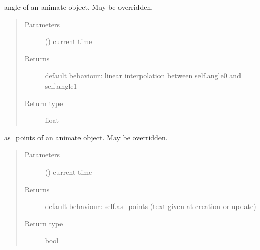 \documentclass[letterpaper,10pt,english]{sphinxmanual}
\begin{document}
\begin{fulllineitems}
\begin{fulllineitems}
\begin{quote}
\begin{description}
\end{description}\end{quote}

\end{fulllineitems}


\begin{fulllineitems}
\label{\detokenize{Reference:salabim.Animate.angle}}
angle of an animate object. May be overridden.
\begin{quote}\begin{description}
\item[{Parameters}] \leavevmode
{} () \textendash{} current time

\item[{Returns}] \leavevmode
{} \textendash{} default behaviour: linear interpolation between self.angle0 and self.angle1

\item[{Return type}] \leavevmode
float

\end{description}\end{quote}

\end{fulllineitems}


\begin{fulllineitems}
\label{\detokenize{Reference:salabim.Animate.as_points}}
as\_points of an animate object. May be overridden.
\begin{quote}\begin{description}
\item[{Parameters}] \leavevmode
{} () \textendash{} current time

\item[{Returns}] \leavevmode
{} \textendash{} default behaviour: self.as\_points (text given at creation or update)

\item[{Return type}] \leavevmode
bool

\end{description}\end{quote}


\end{fulllineitems}
\end{fulllineitems}
\end{document}
